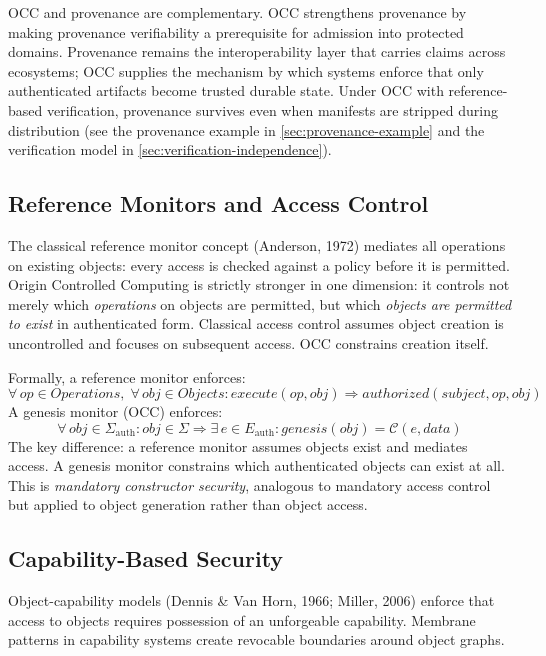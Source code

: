 \documentclass[11pt,letterpaper]{article}
\theoremstyle{occplain}
\theoremstyle{occremark}
\newcommand{\Sigauth}{\Sigma_{\mathrm{auth}}}
\newcommand{\Eauth}{E_{\mathrm{auth}}}
\begin{document}
OCC and provenance are complementary. OCC strengthens provenance by making provenance verifiability a prerequisite for admission into protected domains. Provenance remains the interoperability layer that carries claims across ecosystems; OCC supplies the mechanism by which systems enforce that only authenticated artifacts become trusted durable state. Under OCC with reference-based verification, provenance survives even when manifests are stripped during distribution (see the provenance example in \cref{sec:provenance-example} and the verification model in \cref{sec:verification-independence}).


\subsection{Reference Monitors and Access Control}
\label{sec:reference-monitors}

The classical reference monitor concept (Anderson, 1972) mediates all operations on existing objects: every access is checked against a policy before it is permitted. Origin Controlled Computing is strictly stronger in one dimension: it controls not merely which \emph{operations} on objects are permitted, but which \emph{objects are permitted to exist} in authenticated form. Classical access control assumes object creation is uncontrolled and focuses on subsequent access. OCC constrains creation itself.

Formally, a reference monitor enforces:
\[
  \forall\, \mathit{op} \in \mathit{Operations},\;
  \forall\, \mathit{obj} \in \mathit{Objects} :
  \mathit{execute}(\mathit{op}, \mathit{obj})
  \Rightarrow
  \mathit{authorized}(\mathit{subject}, \mathit{op}, \mathit{obj})
\]
A genesis monitor (OCC) enforces:
\[
  \forall\, \mathit{obj} \in \Sigauth :
  \mathit{obj} \in \Sigma
  \Rightarrow
  \exists\, e \in \Eauth :
  \mathit{genesis}(\mathit{obj}) = \mathcal{C}(e, \mathit{data})
\]
The key difference: a reference monitor assumes objects exist and mediates access. A genesis monitor constrains which authenticated objects can exist at all. This is \emph{mandatory constructor security}, analogous to mandatory access control but applied to object generation rather than object access.


\subsection{Capability-Based Security}
\label{sec:capability}

Object-capability models (Dennis \& Van Horn, 1966; Miller, 2006) enforce that access to objects requires possession of an unforgeable capability. Membrane patterns in capability systems create revocable boundaries around object graphs.
\end{document}
